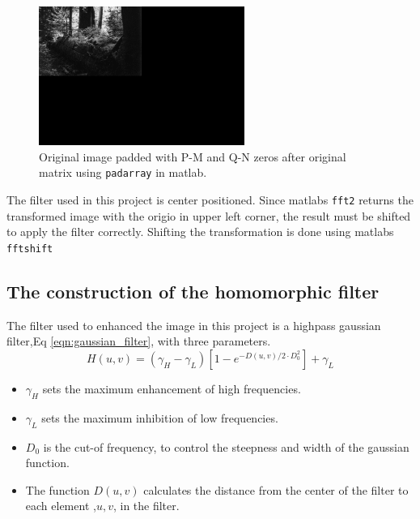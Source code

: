 \begin{figure}[h!]
  \begin{center}
    \includegraphics[width=0.6\textwidth]{pics/zeroPadded.png}
  \end{center}
  \cprotect\caption{Original image padded with P-M and Q-N zeros after original matrix using \verb~padarray~ in matlab.}
  \label{fig:zeropadded}    
\end{figure}

The filter used in this project is center positioned. Since matlabs \verb~fft2~ returns the transformed image with the origio in upper left corner, the result must be shifted to apply the filter correctly. Shifting the transformation is done using matlabs \verb~fftshift~

\subsection{The construction of the homomorphic filter}
The filter used to enhanced the image in this project is a highpass gaussian filter,Eq \ref{eqn:gaussian_filter}, with three parameters. 
    \begin{equation}
    \label{eqn:gaussian_filter}
      H(u,v) = \left( \gamma_H - \gamma_L \right) \left[ 1 - e^{- D(u,v) /2 \cdot D_0^2}\right] + \gamma_L 
    \end{equation}

\begin{itemize}
  \item $\gamma_H$ sets the maximum enhancement of high frequencies.
  \item $\gamma_L$ sets the maximum inhibition of low frequencies.
  \item $D_0$ is the cut-of frequency, to control the steepness and width of the gaussian function.
  \item The function $D(u,v)$ calculates the distance from the center of the filter to each element ,$u,v$, in the filter.  
\end{itemize}

